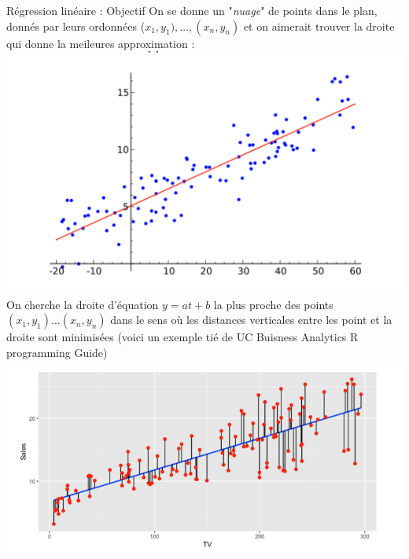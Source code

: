         \begin{parag}{Régression linéaire : Objectif}
            On se donne un "\textit{nuage}" de points dans le plan, donnés par leurs ordonnées ($x_1, y_1), \dots, (x_n, y_n)$ et on aimerait trouver la droite qui donne la meileures approximation :
            \includegraphics[scale=0.3]{Algèbre linéàaire/Screenshot 2024-12-10 153727.png}
            On cherche la droite d'équation $y = at + b$ la plus proche des points $(x_1, y_1)\dots (x_n, y_n)$ dans le sens où les distances verticales entre les point et la droite sont minimisées (voici un exemple tié de UC Buisness Analytics R programming Guide)
            \includegraphics[scale = 0.5]{Algèbre linéàaire/Screenshot 2024-12-10 153930.png}
        \end{parag}
